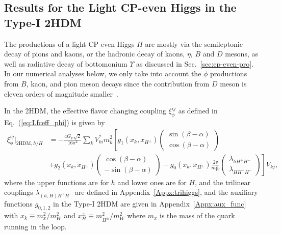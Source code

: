 \documentclass[letterpaper,11pt]{article}
\begin{document}
 


\subsection{Results for the Light CP-even Higgs in the Type-I 2HDM}

The productions of a light CP-even Higgs $H$ are mostly via the semileptonic decay of pions and kaons, or the hadronic decay of kaons, $\eta$, $B$ and $D$ mesons, as well as radiative decay of bottomonium $\Upsilon$ as discussed in Sec.~\ref{sec:cp-even-pro}.    
In our numerical analyses below, we only take into account the $\phi$  productions from $B$, kaon, and pion meson decays since the contribution from $D$ meson is eleven orders of magnitude smaller~\cite{Boiarska:2019jym}.

 
In the 2HDM, the effective flavor changing coupling $\xi_\phi^{ij}$ as defined in Eq.~(\ref{eq:Lfceff_phi})  is given by~\cite{Eilam:1989zm, Li:2014fea, Cheng:2015yfu, Arnan:2017lxi}    
 \begin{align}
    \xi_\phi^{ij}|_{\text{2HDM},h/H}&=-\frac{4G_F\sqrt{2}}{16\pi^2}\sum_k V_{ki}^* m_k^2\left[g_1(x_k, x_{H^\pm}) \begin{pmatrix}\sin(\beta-\alpha) \\ \cos(\beta-\alpha)\end{pmatrix} \right. \nonumber \\
    &\left. +g_2(x_k, x_{H^\pm}) \begin{pmatrix}\cos(\beta-\alpha)\\ -\sin(\beta-\alpha)\end{pmatrix}-g_0(x_k, x_{H^\pm}) \frac{2v}{m_W^2}\begin{pmatrix}\lambda_{h H^+ H^-} \\ \lambda_{H H^+ H^-}\end{pmatrix}\right] V_{kj}, \label{eq:xi_H_2HDM}
\end{align}
where the upper functions are for $h$ and lower ones are for $H$, and the trilinear couplings $\lambda_{(h,H)H^+ H^-}$ are defined in Appendix~\ref{Appx:trihiggs}, and the auxiliary functions $g_{0, 1, 2}$ in the Type-I 2HDM are given in Appendix~\ref{Appx:aux_func} with $x_k\equiv m_x^2/m_W^2$ and $x_H^\pm\equiv m_{H^\pm}^2/m_W^2$ where $m_x$ is the mass of the quark running in the loop.  
\end{document}
